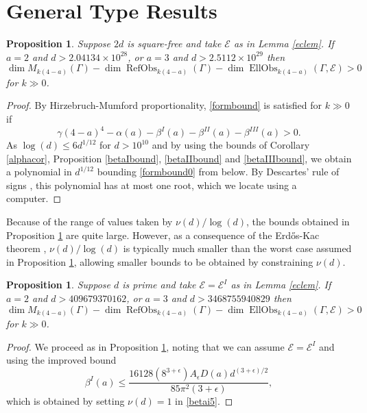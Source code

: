 \documentclass[12pt, a4paper]{article}
\newtheorem{proposition}[thm]{Proposition}
\newcommand{\ec}{\mathcal{E}}
\newcommand{\opn}{\operatorname}
\begin{document}
 \section{General Type Results}\label{GTsec}
\begin{proposition}\label{mfbounds1}
    Suppose $2d$ is square-free and take $\ec$ as in Lemma \ref{eclem}.
    If  $a=2$ and $d>2.04134 \times 10^{28}$, 
    or $a=3$ and $d>2.5112 \times 10^{29}$ then 
    \begin{equation}\label{formbound}
      \opn{dim} M_{k(4-a)}(\Gamma) 
      - \opn{dim} \opn{RefObs}_{k(4-a)}(\Gamma)
        - \opn{dim} \opn{EllObs}_{k(4-a)}(\Gamma, \ec)
        > 0 
    \end{equation}
    for $k \gg 0$.
  \end{proposition}
  \begin{proof}
    By Hirzebruch-Mumford proportionality, \eqref{formbound} is satisfied for $k \gg 0$ if
    \begin{equation}\label{formbound0}
      \gamma (4-a)^4
      - \alpha(a)
      - \beta^I(a)
      - \beta^{II}(a)
      - \beta^{III}(a) > 0.
    \end{equation}
    As  $\opn{log}(d) \leq 6 d^{1/12}$ for $d>10^{10}$ and by using the bounds of Corollary \ref{alphacor}, Proposition  \ref{betaIbound}, \ref{betaIIbound} and \ref{betaIIIbound}, we obtain a polynomial in $d^{1/12}$ bounding \eqref{formbound0} from below.
    By Descartes' rule of signs \cite{Descartes}, this polynomial has at most one root, which we locate using a computer.
\end{proof}
  Because of the range of values taken by $\nu(d)/\opn{log}(d)$, the bounds obtained in Proposition \ref{mfbounds1} are quite large.
  However, as a consequence of the Erd\H{o}s-Kac theorem \cite{ErdosKac}, $\nu(d)/\opn{log}(d)$ is typically much smaller than the worst case assumed in Proposition \ref{mfbounds1}, allowing smaller bounds to be obtained by constraining $\nu(d)$.
\begin{proposition}\label{mfbounds2}
    Suppose $d$ is prime and take $\ec=\ec^I$ as in Lemma \ref{eclem}.
    If
    $a=2$ and $d>409679370162$, or 
    $a=3$ and $d>3468755940829$
    then
\[ 
    \opn{dim} M_{k(4-a)}(\Gamma) 
      - \opn{dim} \opn{RefObs}_{k(4-a)}(\Gamma)
        - \opn{dim} \opn{EllObs}_{k(4-a)}(\Gamma, \ec)
        > 0
        \]
for $k \gg 0$.
\end{proposition}
\begin{proof}
  We proceed as in Proposition \ref{mfbounds1}, noting that we can assume $\ec=\ec^I$ and using the improved bound
  \[
  \beta^I(a)
  \leq
  \frac{16128(8^{3+\epsilon})A_{\epsilon}D(a)d^{(3+\epsilon)/2}}{85 \pi^2 (3 + \epsilon)},
  \]
  which is obtained by setting $\nu(d)=1$ in \eqref{betai5}.
\end{proof}
\end{document}
